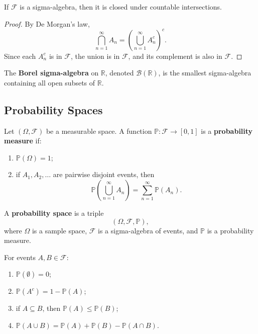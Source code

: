 \begin{proposition}
If $\mathcal{F}$ is a sigma-algebra, then it is closed under countable intersections.
\end{proposition}

\begin{proof}
By De Morgan's law,
\[
    \bigcap_{n=1}^{\infty}A_n=\left(\bigcup_{n=1}^{\infty}A_n^c\right)^c.
\]
Since each $A_n^c$ is in $\mathcal{F}$, the union is in $\mathcal{F}$, and its complement is also in $\mathcal{F}$.
\end{proof}

\begin{definition}
The \textbf{Borel sigma-algebra} on $\mathbb{R}$, denoted $\mathcal{B}(\mathbb{R})$, is the smallest sigma-algebra containing all open subsets of $\mathbb{R}$.
\end{definition}

\subsection{Probability Spaces}

\begin{definition}
Let $(\Omega,\mathcal{F})$ be a measurable space. A function $\mathbb{P}:\mathcal{F}\to[0,1]$ is a \textbf{probability measure} if:
\begin{enumerate}
    \item $\mathbb{P}(\Omega)=1$;
    \item if $A_1,A_2,\dots$ are pairwise disjoint events, then
    \[
        \mathbb{P}\left(\bigcup_{n=1}^{\infty}A_n\right)=\sum_{n=1}^{\infty}\mathbb{P}(A_n).
    \]
\end{enumerate}
\end{definition}

\begin{definition}
A \textbf{probability space} is a triple
\[
    (\Omega,\mathcal{F},\mathbb{P}),
\]
where $\Omega$ is a sample space, $\mathcal{F}$ is a sigma-algebra of events, and $\mathbb{P}$ is a probability measure.
\end{definition}

\begin{proposition}
For events $A,B\in\mathcal{F}$:
\begin{enumerate}
    \item $\mathbb{P}(\emptyset)=0$;
    \item $\mathbb{P}(A^c)=1-\mathbb{P}(A)$;
    \item if $A\subseteq B$, then $\mathbb{P}(A)\leq\mathbb{P}(B)$;
    \item $\mathbb{P}(A\cup B)=\mathbb{P}(A)+\mathbb{P}(B)-\mathbb{P}(A\cap B)$.
\end{enumerate}
\end{proposition}

